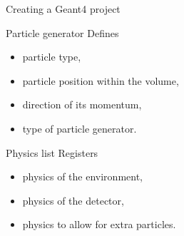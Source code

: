 \documentclass[11pt]{beamer}
\begin{document}
\begin{frame}{Creating a Geant4 project}
    \begin{block}{Particle generator}
    Defines
    \begin{itemize}
        \item particle type,
        \item particle position within the volume,
        \item direction of its momentum,
        \item type of particle generator.
    \end{itemize}
    \end{block}
    
    \begin{block}{Physics list}
    Registers
    \begin{itemize}
        \item physics of the environment,
        \item physics of the detector,
        \item physics to allow for extra particles.
    \end{itemize}
    \end{block}
\end{frame}
\end{document}
